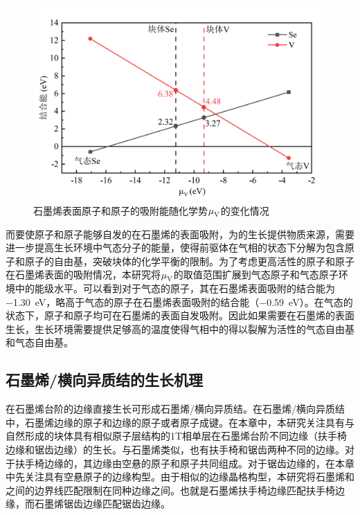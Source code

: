     \begin{figure}[htb]
        \includegraphics{pic/VS_DFT_adatoms.png}
        \caption{石墨烯表面原子和原子的吸附能随化学势$\it \mu_{\rm V}^{\rm } \it$的变化情况}
        \label{fig:VS_DFT_adatoms}
    \end{figure}

    而要使原子和原子能够自发的在石墨烯的表面吸附，为的生长提供物质来源，需要进一步提高生长环境中气态分子的能量，使得前驱体在气相的状态下分解为包含原子和原子的自由基，突破块体的化学平衡的限制。为了考虑更高活性的原子和原子在石墨烯表面的吸附情况，本研究将$\it \mu_{\rm V}^{\rm } \it$的取值范围扩展到气态原子和气态原子环境中的能级水平。可以看到对于气态的原子，其在石墨烯表面吸附的结合能为\SI{-1.30}{\electronvolt}，略高于气态的原子在石墨烯表面吸附的结合能（\SI{-0.59}{\electronvolt}）。在气态的状态下，原子和原子均可在石墨烯的表面自发吸附。因此如果需要在石墨烯的表面生长，生长环境需要提供足够高的温度使得气相中的得以裂解为活性的气态自由基和气态自由基。

\subsection{石墨烯/横向异质结的生长机理}
    在石墨烯台阶的边缘直接生长可形成石墨烯/横向异质结。在石墨烯/横向异质结中，石墨烯边缘的原子和边缘的原子或者原子成键。在本章中，本研究关注具有与自然形成的块体具有相似原子层结构的1T相单层在石墨烯台阶不同边缘（扶手椅边缘和锯齿边缘）的生长。与石墨烯类似，也有扶手椅和锯齿两种不同的边缘。对于扶手椅边缘的，其边缘由空悬的原子和原子共同组成。对于锯齿边缘的，在本章中先关注具有空悬原子的边缘构型。由于相似的边缘晶格构型，本研究将石墨烯和之间的边界线匹配限制在同种边缘之间。也就是石墨烯扶手椅边缘匹配扶手椅边缘，而石墨烯锯齿边缘匹配锯齿边缘。


